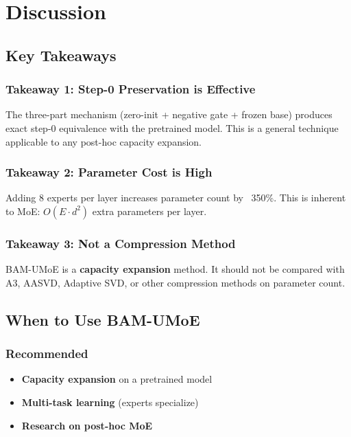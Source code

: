 \section{Discussion}

\subsection{Key Takeaways}

\subsubsection{Takeaway 1: Step-0 Preservation is Effective}

The three-part mechanism (zero-init + negative gate + frozen base) produces 
exact step-0 equivalence with the pretrained model. This is a general 
technique applicable to any post-hoc capacity expansion.

\subsubsection{Takeaway 2: Parameter Cost is High}

Adding 8 experts per layer increases parameter count by ~350\%. 
This is inherent to MoE: $O(E \cdot d^2)$ extra parameters per layer.

\subsubsection{Takeaway 3: Not a Compression Method}

BAM-UMoE is a \textbf{capacity expansion} method. It should not be compared with 
A3, AASVD, Adaptive SVD, or other compression methods on parameter count.

\subsection{When to Use BAM-UMoE}

\subsubsection{Recommended}
\begin{itemize}
\item \textbf{Capacity expansion} on a pretrained model
\item \textbf{Multi-task learning} (experts specialize)
\item \textbf{Research on post-hoc MoE}

\end{itemize}
